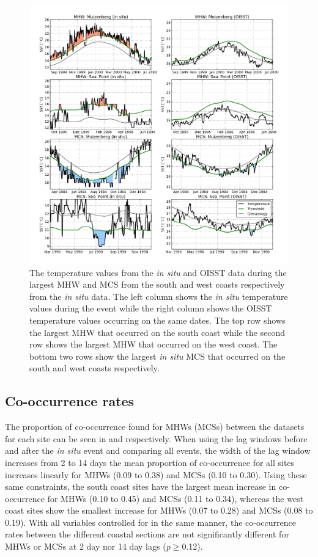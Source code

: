 \documentclass[a4paper,10pt,review]{elsarticle}
\begin{document}
\begin{figure}
\centering
\includegraphics[width=1.0\textwidth]{figure3.png}
\caption{The temperature values from the \emph{in situ} and OISST data during the largest MHW and MCS from the south and west coasts respectively from the \emph{in situ} data. The left column shows the \emph{in situ} temperature values during the event while the right column shows the OISST temperature values occurring on the same dates. The top row shows the largest MHW that occurred on the south coast while the second row shows the largest MHW that occurred on the west coast. The bottom two rows show the largest \emph{in situ} MCS that occurred on the south and west coasts respectively.}
\label{fig:Figure3}
\end{figure}

\subsection{Co-occurrence rates}
The proportion of co-occurrence found for MHWs (MCSs) between the datasets for each site can be seen in  and  respectively. When using the lag windows before and after the \emph{in situ} event and comparing all events, the width of the lag window increases from 2 to 14 days the mean proportion of co-occurrence for all sites increases linearly for MHWs (0.09 to 0.38) and MCSs (0.10 to 0.30). Using these same constraints, the south coast sites have the largest mean increase in co-occurrence for MHWs (0.10 to 0.45) and MCSs (0.11 to 0.34), whereas the west coast sites show the smallest increase for MHWs (0.07 to 0.28) and MCSs (0.08 to 0.19). With all variables controlled for in the same manner, the co-occurrence rates between the different coastal sections are not significantly different for MHWs or MCSs at 2 day nor 14 day lags (\emph{p}$\geq$0.12).
\end{document}
